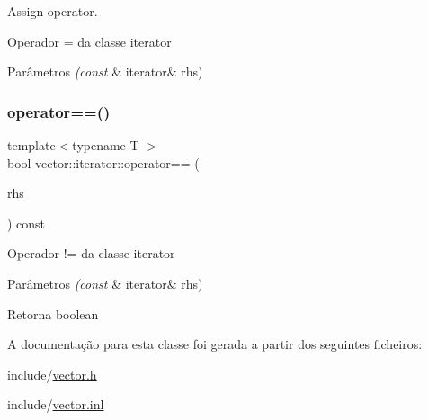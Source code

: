Assign operator. 

Operador = da classe iterator 
\begin{DoxyParams}{Parâmetros}
{\em (const} & iterator\& rhs) \\
\hline
\end{DoxyParams}
\mbox{\label{classsc_1_1vector_1_1iterator_a2beb436266683c273335e69c7d26ce2c}} 
\subsubsection{\texorpdfstring{operator==()}{operator==()}}
{\footnotesize\ttfamily template$<$typename T $>$ \\
bool vector\+::iterator\+::operator== (\begin{DoxyParamCaption}\item[{const \mbox{\hyperlink{classsc_1_1vector_1_1iterator}{iterator}} \&}]{rhs }\end{DoxyParamCaption}) const}

Operador != da classe iterator 
\begin{DoxyParams}{Parâmetros}
{\em (const} & iterator\& rhs) \\
\hline
\end{DoxyParams}
\begin{DoxyReturn}{Retorna}
boolean 
\end{DoxyReturn}


A documentação para esta classe foi gerada a partir dos seguintes ficheiros\+:\begin{DoxyCompactItemize}
\item 
include/\mbox{\hyperlink{vector_8h}{vector.\+h}}\item 
include/\mbox{\hyperlink{vector_8inl}{vector.\+inl}}\end{DoxyCompactItemize}
